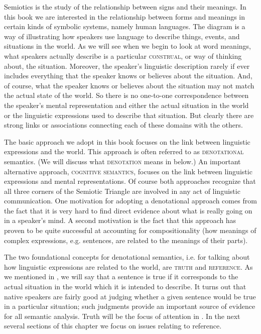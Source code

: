 Semiotics is the study of the relationship between signs and their meanings. In this book we are interested in the relationship between forms and meanings in certain kinds of symbolic systems, namely human languages. The diagram is a way of illustrating how speakers use language to describe things, events, and situations in the world. As we will see when we begin to look at word meanings, what speakers actually describe is a particular \textsc{construal}, or way of thinking about, the situation. Moreover, the speaker’s linguistic description rarely if ever includes everything that the speaker knows or believes about the situation. And, of course, what the speaker knows or believes about the situation may not match the actual state of the world. So there is no one-to-one correspondence between the speaker’s mental representation and either the actual situation in the world or the linguistic expressions used to describe that situation. But clearly there are strong links or associations connecting each of these domains with the others.



The basic approach we adopt in this book focuses on the link between linguistic expressions and the world. This approach is often referred to as \textsc{denotational} semantics. (We will discuss what \textsc{denotation} means in  below.) An important alternative approach, \textsc{cognitive semantics}, focuses on the link between linguistic expressions and mental representations. Of course both approaches recognize that all three corners of the Semiotic Triangle are involved in any act of linguistic communication. One motivation for adopting a denotational approach comes from the fact that it is very hard to find direct evidence about what is really going on in a speaker’s mind. A second motivation is the fact that this approach has proven to be quite successful at accounting for compositionality (how meanings of complex expressions, e.g. sentences, are related to the meanings of their parts).



The two foundational concepts for denotational semantics, i.e. for talking about how linguistic expressions are related to the world, are \textsc{truth} and \textsc{reference}. As we mentioned in , we will say that a sentence is true if it corresponds to the actual situation in the world which it is intended to describe. It turns out that native speakers are fairly good at judging whether a given sentence would be true in a particular situation; such judgments provide an important source of evidence for all semantic analysis. Truth will be the focus of attention in . In the next several sections of this chapter we focus on issues relating to reference.


